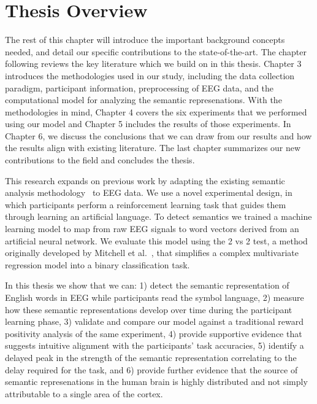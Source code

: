 \section{Thesis Overview}

The rest of this chapter will introduce the important background concepts 
needed, and detail our specific contributions to the state-of-the-art. The 
chapter following reviews the key literature which we build on in this thesis.  
Chapter 3 introduces the methodologies used in our study, including the data 
collection paradigm, participant information, preprocessing of EEG data, and 
the computational model for analyzing the semantic represenations. With the 
methodologies in mind, Chapter 4 covers the six experiments that we performed 
using our model and Chapter 5 includes the results of those experiments. In 
Chapter 6, we discuss the conclusions that we can draw from our results and how 
the results align with existing literature. The last chapter summarizes our new 
contributions to the field and concludes the thesis.

This research expands on previous work by adapting the existing semantic 
analysis methodology~\cite{Mitchell2008,Sudre2012} to EEG data.  We use a novel 
experimental design, in which participants perform a reinforcement learning 
task that guides them through learning an artificial language. To detect 
semantics we trained a machine learning model to map from raw EEG signals to 
word vectors derived from an artificial neural network. We evaluate this model 
using the 2 vs 2 test, a method originally developed by Mitchell et 
al.~\cite{Mitchell2008}, that simplifies a complex multivariate regression 
model into a binary classification task.

In this thesis we show that we can: 1) detect the semantic representation of 
English words in EEG while participants read the symbol language, 2) measure 
how these semantic representations develop over time during the participant 
learning phase, 3) validate and compare our model against a traditional reward 
positivity analysis of the same experiment, 4) provide supportive evidence that 
suggests intuitive alignment with the participants' task accuracies, 5) 
identify a delayed peak in the strength of the semantic representation 
correlating to the delay required for the task, and 6) provide further evidence 
that the source of semantic represenations in the human brain is highly 
distributed and not simply attributable to a single area of the cortex.
